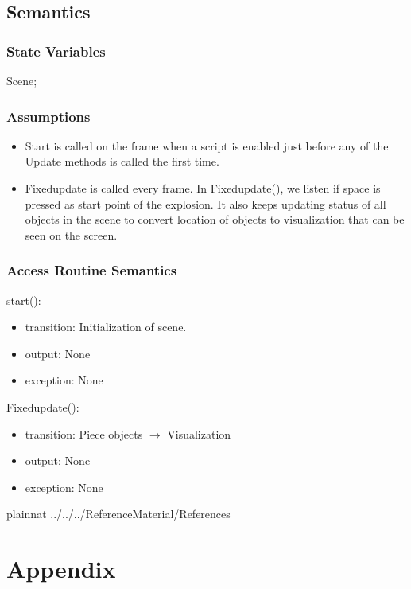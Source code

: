 \documentclass[12pt, titlepage]{article}
\begin{document}
\subsection{Semantics}

\subsubsection{State Variables}
Scene;\\

\subsubsection{Assumptions}

\noindent
\begin{itemize}
	\item Start is called on the frame when a script is enabled just before any of the Update methods is called the first time.
	\item Fixedupdate is called every frame. In Fixedupdate(), we listen if space is pressed as start point of the explosion. It also keeps updating status of all objects in the scene to convert location of objects to visualization that can be seen on the screen.
\end{itemize}

\subsubsection{Access Routine Semantics}

\noindent start():
\begin{itemize}
	\item transition: Initialization of scene.
	\item output: None 
	\item exception: None  
\end{itemize}

\noindent Fixedupdate():
\begin{itemize}
	\item transition: Piece objects $\rightarrow$ Visualization 
	\item output: None 
	\item exception: None  
\end{itemize}


\newpage

 {plainnat}
 {../../../ReferenceMaterial/References}

\newpage

\section{Appendix} \label{Appendix}

\end{document}
